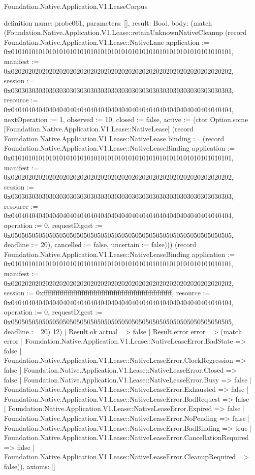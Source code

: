 \begin{lexlean}{Foundation.Native.Application.V1.LeaseCorpus}
\begin{semanticmodule}
definition{
  name: probe061,
  parameters: [],
  result: Bool,
  body: (match (Foundation.Native.Application.V1.Lease::retainUnknownNativeCleanup (record Foundation.Native.Application.V1.Lease::NativeLane {application := 0x0101010101010101010101010101010101010101010101010101010101010101, manifest := 0x0202020202020202020202020202020202020202020202020202020202020202, session := 0x0303030303030303030303030303030303030303030303030303030303030303, resource := 0x0404040404040404040404040404040404040404040404040404040404040404, nextOperation := 1, observed := 10, closed := false, active := (ctor Option.some [Foundation.Native.Application.V1.Lease::NativeLease] (record Foundation.Native.Application.V1.Lease::NativeLease {binding := (record Foundation.Native.Application.V1.Lease::NativeLeaseBinding {application := 0x0101010101010101010101010101010101010101010101010101010101010101, manifest := 0x0202020202020202020202020202020202020202020202020202020202020202, session := 0x0303030303030303030303030303030303030303030303030303030303030303, resource := 0x0404040404040404040404040404040404040404040404040404040404040404, operation := 0, requestDigest := 0x0505050505050505050505050505050505050505050505050505050505050505, deadline := 20}), cancelled := false, uncertain := false}))}) (record Foundation.Native.Application.V1.Lease::NativeLeaseBinding {application := 0x0101010101010101010101010101010101010101010101010101010101010101, manifest := 0x0202020202020202020202020202020202020202020202020202020202020202, session := 0xffffffffffffffffffffffffffffffffffffffffffffffffffffffffffffffff, resource := 0x0404040404040404040404040404040404040404040404040404040404040404, operation := 0, requestDigest := 0x0505050505050505050505050505050505050505050505050505050505050505, deadline := 20}) 12)
    | Result.ok actual => false
    | Result.error error => (match error
      | Foundation.Native.Application.V1.Lease::NativeLeaseError.BadState => false
      | Foundation.Native.Application.V1.Lease::NativeLeaseError.ClockRegression => false
      | Foundation.Native.Application.V1.Lease::NativeLeaseError.Closed => false
      | Foundation.Native.Application.V1.Lease::NativeLeaseError.Busy => false
      | Foundation.Native.Application.V1.Lease::NativeLeaseError.Exhausted => false
      | Foundation.Native.Application.V1.Lease::NativeLeaseError.BadRequest => false
      | Foundation.Native.Application.V1.Lease::NativeLeaseError.Expired => false
      | Foundation.Native.Application.V1.Lease::NativeLeaseError.NoPending => false
      | Foundation.Native.Application.V1.Lease::NativeLeaseError.BadBinding => true
      | Foundation.Native.Application.V1.Lease::NativeLeaseError.CancellationRequired => false
      | Foundation.Native.Application.V1.Lease::NativeLeaseError.CleanupRequired => false)),
  axioms: []
}


\end{semanticmodule}
\end{lexlean}
